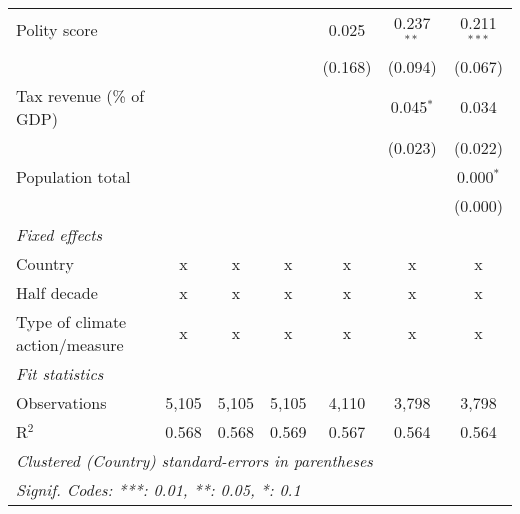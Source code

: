 \begin{tabular}{lcccccc}
   Polity score                                                  &              &               &                & 0.025          & 0.237$^{**}$   & 0.211$^{***}$\\   
                                                                 &              &               &                & (0.168)        & (0.094)        & (0.067)\\   
   Tax revenue (\% of GDP)                                       &              &               &                &                & 0.045$^{*}$    & 0.034\\   
                                                                 &              &               &                &                & (0.023)        & (0.022)\\   
   Population total                                              &              &               &                &                &                & 0.000$^{*}$\\   
                                                                 &              &               &                &                &                & (0.000)\\   
   \emph{Fixed effects}\\
   Country                                                       & x            & x             & x              & x              & x              & x\\  
   Half decade                                                   & x            & x             & x              & x              & x              & x\\  
   Type of climate action/measure                                & x            & x             & x              & x              & x              & x\\  
   \midrule \emph{Fit statistics}\\
   Observations                                                  & 5,105        & 5,105         & 5,105          & 4,110          & 3,798          & 3,798\\  
   R$^2$                                                         & 0.568        & 0.568         & 0.569          & 0.567          & 0.564          & 0.564\\  
   \midrule
   \multicolumn{7}{l}{\emph{Clustered (Country) standard-errors in parentheses}}\\
   \multicolumn{7}{l}{\emph{Signif. Codes: ***: 0.01, **: 0.05, *: 0.1}}\\
\end{tabular}
\par\endgroup



